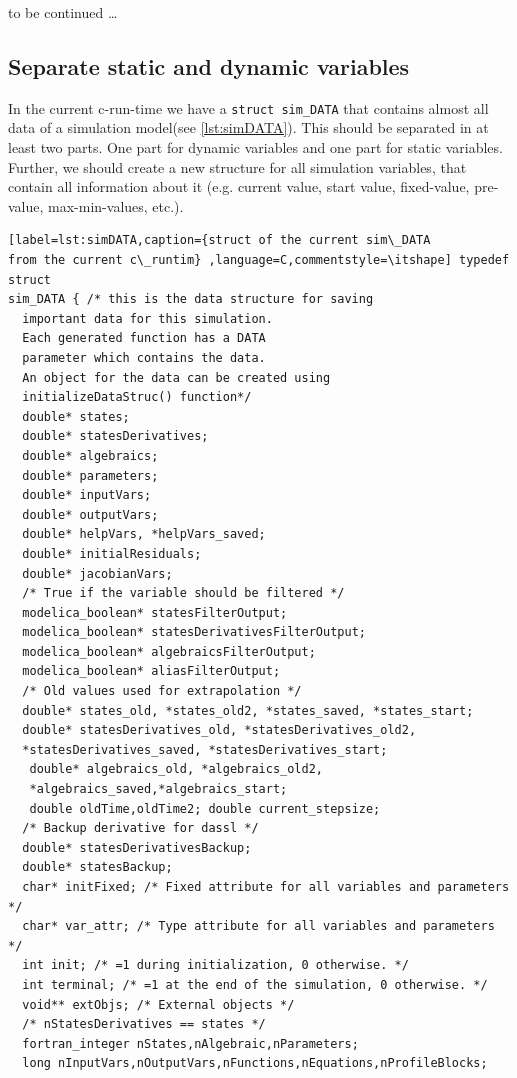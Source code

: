 to be continued \ldots

\subsection{Separate static and dynamic variables}\label{sec:separetdata}

In the current c-run-time we have a \lstinline{struct sim_DATA} that
contains almost all data of a simulation model(see \ref{lst:simDATA}). This
should be separated in at least two parts. One part for dynamic variables and
one part for static variables. Further, we should create a new structure for all
simulation variables, that contain all information about it (e.g. current
value, start value, fixed-value, pre-value, max-min-values, etc.).

\begin{lstlisting}[label=lst:simDATA,caption={struct of the current sim\_DATA
from the current c\_runtim} ,language=C,commentstyle=\itshape] typedef struct
sim_DATA { /* this is the data structure for saving
  important data for this simulation.
  Each generated function has a DATA
  parameter which contains the data.
  An object for the data can be created using
  initializeDataStruc() function*/
  double* states;
  double* statesDerivatives;
  double* algebraics;
  double* parameters;
  double* inputVars;
  double* outputVars;
  double* helpVars, *helpVars_saved;
  double* initialResiduals;
  double* jacobianVars;
  /* True if the variable should be filtered */
  modelica_boolean* statesFilterOutput;
  modelica_boolean* statesDerivativesFilterOutput;
  modelica_boolean* algebraicsFilterOutput;
  modelica_boolean* aliasFilterOutput;
  /* Old values used for extrapolation */
  double* states_old, *states_old2, *states_saved, *states_start;
  double* statesDerivatives_old, *statesDerivatives_old2,
  *statesDerivatives_saved, *statesDerivatives_start;
   double* algebraics_old, *algebraics_old2,
   *algebraics_saved,*algebraics_start;
   double oldTime,oldTime2; double current_stepsize;
  /* Backup derivative for dassl */
  double* statesDerivativesBackup;
  double* statesBackup;
  char* initFixed; /* Fixed attribute for all variables and parameters */
  char* var_attr; /* Type attribute for all variables and parameters */
  int init; /* =1 during initialization, 0 otherwise. */
  int terminal; /* =1 at the end of the simulation, 0 otherwise. */
  void** extObjs; /* External objects */
  /* nStatesDerivatives == states */
  fortran_integer nStates,nAlgebraic,nParameters;
  long nInputVars,nOutputVars,nFunctions,nEquations,nProfileBlocks;

\end{lstlisting}
